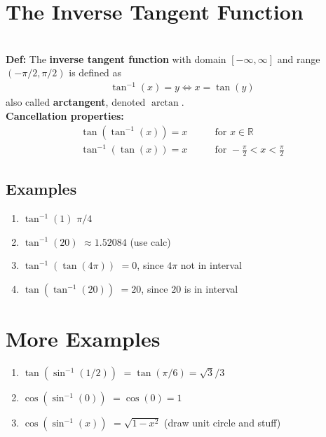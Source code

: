 \documentclass{tufte-handout}
\newcommand{\R}[1]{\mathbb{R}^{#1}}
\begin{document}
\section{The Inverse Tangent Function}
 \\
\textbf{Def:} The \textbf{inverse tangent function} with domain $[-\infty, \infty]$ and range $(-\pi/2, \pi/2)$ is defined as
\begin{align*}
\tan^{-1}(x) = y \Leftrightarrow x = \tan(y)
\end{align*}
also called \textbf{arctangent}, denoted $\arctan$. \\
\textbf{Cancellation properties:} 
\begin{align*}
\tan(\tan^{-1}(x)) = x &\qquad \text{for } x\in \R{} \\
\tan^{-1}(\tan(x)) = x &\qquad \text{for } -\frac{\pi}{2} < x < \frac{\pi}{2}
\end{align*}

\subsection{Examples}
\begin{enumerate}
\item $\tan^{-1}(1)$ {\color{blue} $\pi/4$}
\item $\tan^{-1}(20)$ {\color{blue} $\approx 1.52084$ (use calc)}
\item $\tan^{-1}(\tan(4\pi))$ {\color{blue} $= 0$, since $4\pi$ not in interval}
\item $\tan(\tan^{-1}(20))$ {\color{blue} $= 20$, since $20$ is in interval}
\end{enumerate}

\section{More Examples}
\begin{enumerate}
\item $\tan(\sin^{-1}(1/2))$ {\color{blue} $= \tan(\pi/6) = \sqrt{3}/3$}
\item $\cos(\sin^{-1}(0))$ {\color{blue} $= \cos(0) = 1$}
\item $\cos(\sin^{-1}(x))$ {\color{blue} $ = \sqrt{1-x^2}$ (draw unit circle and stuff)}
\end{enumerate}
\end{document}
